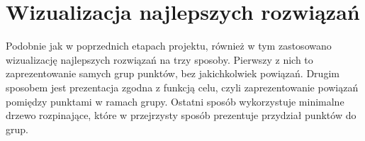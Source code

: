 \documentclass[main.tex]{subfiles}
\begin{document}
\section{Wizualizacja najlepszych rozwiązań}
Podobnie jak w poprzednich etapach projektu, również w tym zastosowano wizualizację najlepszych rozwiązań na trzy sposoby. Pierwszy z nich to zaprezentowanie samych grup punktów, bez jakichkolwiek powiązań. Drugim sposobem jest prezentacja zgodna z funkcją celu, czyli zaprezentowanie powiązań pomiędzy punktami w ramach grupy. Ostatni sposób wykorzystuje minimalne drzewo rozpinające, które w przejrzysty sposób prezentuje przydział punktów do grup.

\begin{figure}[H]
     \begin{center}
        \\
    \end{center}
\end{figure}
\end{document}
